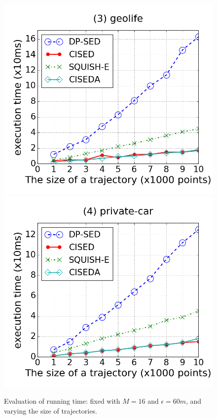 \begin{figure}[tb!]
\includegraphics[scale = 0.250]{figures/Exp-time-size-geolife.png}
\includegraphics[scale = 0.250]{figures/Exp-time-size-private.png}
\vspace{-2ex}
\caption{\small Evaluation of running time: fixed with $M=16$ and $\epsilon=60m$, and varying the size of trajectories.}
\label{fig:time-size}
\vspace{-2ex}
\end{figure}



